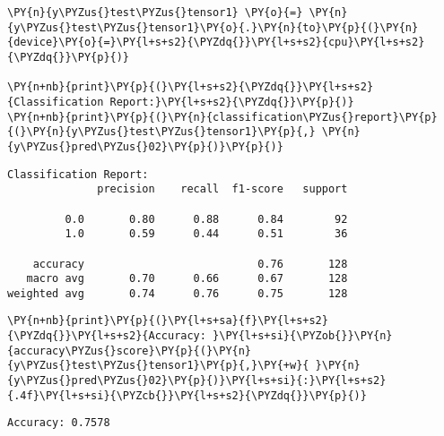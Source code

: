     \begin{tcolorbox}[breakable, size=fbox, boxrule=1pt, pad at break*=1mm,colback=cellbackground, colframe=cellborder]
\begin{Verbatim}[commandchars=\\\{\}]
\PY{n}{y\PYZus{}test\PYZus{}tensor1} \PY{o}{=} \PY{n}{y\PYZus{}test\PYZus{}tensor1}\PY{o}{.}\PY{n}{to}\PY{p}{(}\PY{n}{device}\PY{o}{=}\PY{l+s+s2}{\PYZdq{}}\PY{l+s+s2}{cpu}\PY{l+s+s2}{\PYZdq{}}\PY{p}{)}

\PY{n+nb}{print}\PY{p}{(}\PY{l+s+s2}{\PYZdq{}}\PY{l+s+s2}{Classification Report:}\PY{l+s+s2}{\PYZdq{}}\PY{p}{)}
\PY{n+nb}{print}\PY{p}{(}\PY{n}{classification\PYZus{}report}\PY{p}{(}\PY{n}{y\PYZus{}test\PYZus{}tensor1}\PY{p}{,} \PY{n}{y\PYZus{}pred\PYZus{}02}\PY{p}{)}\PY{p}{)}
\end{Verbatim}
\end{tcolorbox}

    \begin{Verbatim}[commandchars=\\\{\}]
Classification Report:
              precision    recall  f1-score   support

         0.0       0.80      0.88      0.84        92
         1.0       0.59      0.44      0.51        36

    accuracy                           0.76       128
   macro avg       0.70      0.66      0.67       128
weighted avg       0.74      0.76      0.75       128

    \end{Verbatim}

    \begin{tcolorbox}[breakable, size=fbox, boxrule=1pt, pad at break*=1mm,colback=cellbackground, colframe=cellborder]
\begin{Verbatim}[commandchars=\\\{\}]
\PY{n+nb}{print}\PY{p}{(}\PY{l+s+sa}{f}\PY{l+s+s2}{\PYZdq{}}\PY{l+s+s2}{Accuracy: }\PY{l+s+si}{\PYZob{}}\PY{n}{accuracy\PYZus{}score}\PY{p}{(}\PY{n}{y\PYZus{}test\PYZus{}tensor1}\PY{p}{,}\PY{+w}{ }\PY{n}{y\PYZus{}pred\PYZus{}02}\PY{p}{)}\PY{l+s+si}{:}\PY{l+s+s2}{.4f}\PY{l+s+si}{\PYZcb{}}\PY{l+s+s2}{\PYZdq{}}\PY{p}{)}
\end{Verbatim}
\end{tcolorbox}

    \begin{Verbatim}[commandchars=\\\{\}]
Accuracy: 0.7578
    \end{Verbatim}

